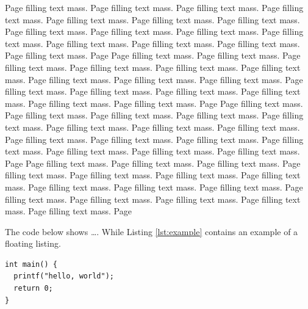 \documentclass[12pt,a4paper,twoside,openright]{book}
\begin{document}
Page filling text mass. Page filling text mass. Page filling text mass. Page
filling text mass. Page filling text mass. Page filling text mass. Page
filling text mass. Page filling text mass. Page filling text mass. Page
filling text mass. Page filling text mass. Page filling text mass. Page
filling text mass. Page filling text mass. Page filling text mass. Page
Page filling text mass. Page filling text mass. Page filling text mass. Page
filling text mass. Page filling text mass. Page filling text mass. Page
filling text mass. Page filling text mass. Page filling text mass. Page
filling text mass. Page filling text mass. Page filling text mass. Page
filling text mass. Page filling text mass. Page filling text mass. Page
Page filling text mass. Page filling text mass. Page filling text mass. Page
filling text mass. Page filling text mass. Page filling text mass. Page
filling text mass. Page filling text mass. Page filling text mass. Page
filling text mass. Page filling text mass. Page filling text mass. Page
filling text mass. Page filling text mass. Page filling text mass. Page
Page filling text mass. Page filling text mass. Page filling text mass. Page
filling text mass. Page filling text mass. Page filling text mass. Page
filling text mass. Page filling text mass. Page filling text mass. Page
filling text mass. Page filling text mass. Page filling text mass. Page
filling text mass. Page filling text mass. Page filling text mass. Page


The code below shows \ldots. While Listing \ref{lst:example} contains an
example of a floating listing.

\begin{samepage}
\begin{verbatim}
int main() {
  printf("hello, world");
  return 0;
}
\end{verbatim}
\label{code:foo1}
\end{samepage}
\end{document}
